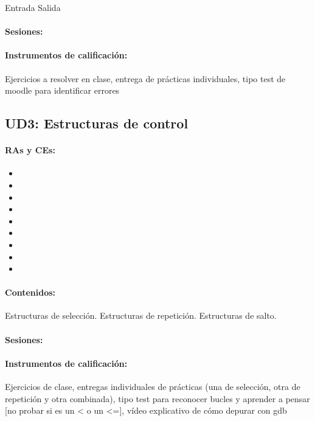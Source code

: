 		Entrada Salida


	\paragraph{Sesiones:} 

	\paragraph{Instrumentos de calificación: } Ejercicios a resolver en clase, entrega de prácticas individuales, tipo test de moodle para identificar errores

\newpage
\subsection{UD3: Estructuras de control}

	\paragraph{RAs y CEs:}
	\begin{itemize}[itemsep=0.1em, topsep=0.1em]
		\item\RATRESa
		\item\RATRESb
		\item\RATRESc
		\item\RATRESe
		\item\RATRESf
		\item\RATRESg		
		\item\RACINCOa
		\item\RACINCOb
		\item\RACINCOc	
	\end{itemize}

	\paragraph{Contenidos:}
		Estructuras de selección.
		Estructuras de repetición.
		Estructuras de salto.


	\paragraph{Sesiones:}

	\paragraph{Instrumentos de calificación:}
		Ejercicios de clase, entregas individuales de prácticas (una de selección, otra de repetición y otra combinada), tipo test para reconocer bucles y aprender a pensar [no probar si es un < o un <=], vídeo explicativo de cómo depurar con gdb



